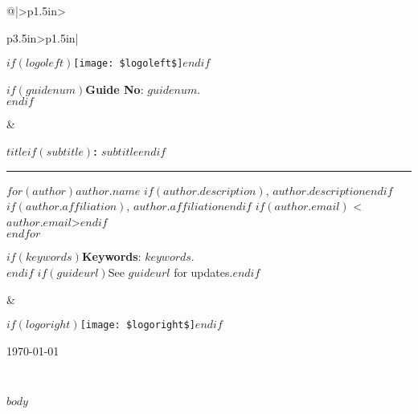 \documentclass[11pt,letterpaper,american]{extarticle}
\providecommand{\tabularnewline}{\\}
\begin{document}
\setlength{\tabcolsep}{1pt}
\begin{tabular}{@{}|>{\centering}p{1.5in}>{\raggedright}p{3.5in}>{\raggedleft}p{1.5in}|}
\hline 
\begin{minipage}[c]{1.5in}%
  \begin{center}
    $if(logoleft)$\texttt{[image: \$logoleft\$]}$endif$
    \par
    \bigskip
    $if(guidenum)${\small{}\textbf{Guide No}: $guidenum$}.\\$endif$
  \end{center}%
\end{minipage} & %
\begin{minipage}[c][1\totalheight][b]{3.5in}%
  \bigskip
  \begin{center}
     \begin{minipage}[t]{1\columnwidth}%
      \begin{center}
        \bigskip
        \textbf{\larger{}$title$$if(subtitle)$: $subtitle$$endif$}
      \end{center}
      \vspace{-15pt}
      \rule[0ex]{1\linewidth}{1pt}%
    \end{minipage}
    \par\end{center}{\Huge \par}
\begin{minipage}[t]{1\columnwidth}%
\begin{center}
  $for(author)$\textbf{$author.name$}%
  $if(author.description)$, $author.description$$endif$%
  $if(author.affiliation)$, $author.affiliation$$endif$%
  $if(author.email)$ <$author.email$>$endif$\\
  \smallskip
$endfor$
\par\end{center}%
\end{minipage}
\begin{flushleft}
  $if(keywords)$\textbf{Keywords}: $keywords$.\\$endif$
  $if(guideurl)$See $guideurl$ for updates.$endif$
  \par\end{flushleft}%
\smallskip
\end{minipage} & %

\begin{minipage}[c]{1.5in}%
\begin{center}
$if(logoright)$\texttt{[image: \$logoright\$]}$endif$
   \par
   \bigskip
   \crmda\today
\par\end{center}
\end{minipage} \tabularnewline
\hline 
\end{tabular}

\medskip{}

$body$
\end{document}
